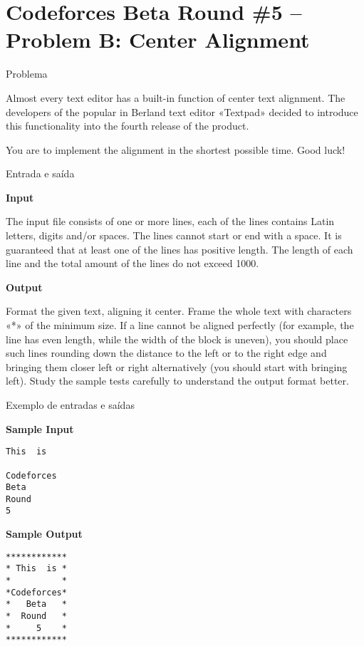 \section{Codeforces Beta Round \#5 -- Problem B: Center Alignment}

\begin{frame}[fragile]{Problema}

Almost every text editor has a built-in function of center text alignment. The developers of the popular in Berland text editor «Textpad» decided to introduce this functionality into the fourth release of the product.

You are to implement the alignment in the shortest possible time. Good luck!

\end{frame}

\begin{frame}[fragile]{Entrada e saída}

\textbf{Input}

The input file consists of one or more lines, each of the lines contains Latin letters, digits and/or spaces. The lines cannot start or end with a space. It is guaranteed that at least one of the lines has positive length. The length of each line and the total amount of the lines do not exceed 1000.

\textbf{Output}

Format the given text, aligning it center. Frame the whole text with characters «*» of the minimum size. If a line cannot be aligned perfectly (for example, the line has even length, while the width of the block is uneven), you should place such lines rounding down the distance to the left or to the right edge and bringing them closer left or right alternatively (you should start with bringing left). Study the sample tests carefully to understand the output format better.

\end{frame}

\begin{frame}[fragile]{Exemplo de entradas e saídas}

\begin{minipage}[t]{0.5\textwidth}
\textbf{Sample Input}
\begin{verbatim}
This  is

Codeforces
Beta
Round
5
\end{verbatim}
\end{minipage}
\begin{minipage}[t]{0.45\textwidth}
\textbf{Sample Output}
\begin{verbatim}
************
* This  is *
*          *
*Codeforces*
*   Beta   *
*  Round   *
*     5    *
************
\end{verbatim}
\end{minipage}
\end{frame}

